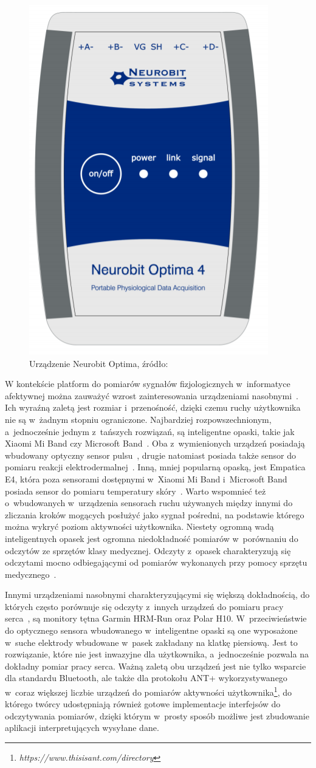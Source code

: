 \begin{figure}
	\centering
	\includegraphics[width=0.3\linewidth]{images/neurobit_optima.png}
	\caption{Urządzenie Neurobit Optima, źródło: \cite{neurobit_manual}}
	\label{fig:neurobit}
\end{figure}

W kontekście platform do pomiarów sygnałów fizjologicznych w~informatyce afektywnej można zauważyć wzrost zainteresowania urządzeniami nasobnymi~\cite{wearable_sensors_2018}. Ich wyraźną zaletą jest rozmiar i~przenośność, dzięki czemu ruchy użytkownika nie są w~żadnym stopniu ograniczone. Najbardziej rozpowszechnionym, a~jednocześnie jednym z~tańszych rozwiązań, są inteligentne opaski, takie jak Xiaomi Mi Band czy Microsoft Band~\cite{wearable_sensors_2018}. Oba z~wymienionych urządzeń posiadają wbudowany optyczny sensor pulsu~\cite{miband_manual,microsoft_band_factsheet}, drugie natomiast posiada także sensor do pomiaru reakcji elektrodermalnej~\cite{microsoft_band_factsheet}. Inną, mniej popularną opaską, jest Empatica E4, która poza sensorami dostępnymi w~Xiaomi Mi Band i~Microsoft Band posiada sensor do pomiaru temperatury skóry~\cite{empatica_manual}. Warto wspomnieć też o~wbudowanych w~urządzenia sensorach ruchu używanych między innymi do zliczania kroków mogących posłużyć jako sygnał pośredni, na podstawie którego można wykryć poziom aktywności użytkownika. Niestety ogromną wadą inteligentnych opasek jest ogromna niedokładność pomiarów w~porównaniu do odczytów ze sprzętów klasy medycznej. Odczyty z~opasek charakteryzują się odczytami mocno odbiegającymi od pomiarów wykonanych przy pomocy sprzętu medycznego~\cite{wearable_sensors_2018,accuracy_of_wearables_hr}.

Innymi urządzeniami nasobnymi charakteryzującymi się większą dokładnością, do których często porównuje się odczyty z~innych urządzeń do pomiaru pracy serca~\cite{wearable_sensors_2018,accuracy_of_wearables_hr}, są monitory tętna Garmin HRM-Run oraz Polar H10. W~przeciwieństwie do optycznego sensora wbudowanego w~inteligentne opaski są one wyposażone w~suche elektrody wbudowane w~pasek zakładany na klatkę piersiową\cite{polar_manual,garmin_manual}. Jest to rozwiązanie, które nie jest inwazyjne dla użytkownika, a~jednocześnie pozwala na dokładny pomiar pracy serca. Ważną zaletą obu urządzeń jest nie tylko wsparcie dla standardu Bluetooth, ale także dla protokołu ANT+ wykorzystywanego w~coraz większej liczbie urządzeń do pomiarów aktywności użytkownika\footnote{\textit{https://www.thisisant.com/directory}}, do którego twórcy udostępniają również gotowe implementacje interfejsów do odczytywania pomiarów, dzięki którym w~prosty sposób możliwe jest zbudowanie aplikacji interpretujących wysyłane dane.

